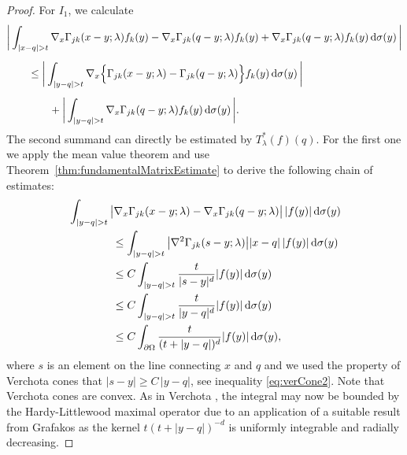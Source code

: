 \begin{proof}
   For $I_1$, we calculate
   \begin{align*}
     &\bigg| \int_{| x - q | > t} \nabla_x \Gamma_{j k} (x - y; \lambda) f_k(y) - \nabla_x \Gamma_{jk}(q - y; \lambda) f_k(y) + \nabla_x \Gamma_{jk}(q - y; \lambda) f_k(y) \, {\operatorname{d}\!{\sigma}}(y) \, \bigg| \\[0.5em]
     &\qquad\leq \bigg| \int_{|y - q| > t} \nabla_x \Big\{ \Gamma_{jk}(x - y; \lambda) -  \Gamma_{jk}(q - y; \lambda)\Big\} f_k(y) \, {\operatorname{d}\!{\sigma}}(y) \, \bigg| \\[0.5em]
     &\qquad\qquad+ \bigg| \int_{|y - q| > t} \nabla_x\Gamma_{jk}(q - y; \lambda) f_k(y) \, {\operatorname{d}\!{\sigma}}(y) \, \bigg|.
   \end{align*}
  The second summand can directly be estimated by $T_\lambda^*(f)(q)$.
  For the first one we apply the mean value theorem and use Theorem~\ref{thm:fundamentalMatrixEstimate} to derive the following chain of estimates:
  \begin{align*}
    &\int_{|y - q| > t} \big| \nabla_x\Gamma_{jk}(x - y; \lambda) - \nabla_x\Gamma_{jk}(q - y; \lambda) \big| \, |f(y)| \, {\operatorname{d}\!{\sigma}}(y) \\ 
    &\qquad\qquad\leq \int_{|y - q| > t} \big|\nabla^2 \Gamma_{jk}(s - y; \lambda)\big| |x - q|\, |f(y) | \, {\operatorname{d}\!{\sigma}}(y) \\
    &\qquad\qquad\leq C \int_{|y - q| > t} \frac{t}{|s - y|^{d}} |f(y)| \, {\operatorname{d}\!{\sigma}}(y) \\
    &\qquad\qquad\leq C \int_{|y - q| > t} \frac{t}{|y - q|^{d}} |f(y)| \, {\operatorname{d}\!{\sigma}}(y) \\
    &\qquad\qquad\leq C \int_{\partial\Omega} \frac{t}{(t + |y - q|)^d} |f(y)| \, {\operatorname{d}\!{\sigma}}(y),
  \end{align*}
  where $s$ is an element on the line connecting $x$ and $q$ and we used the property of Verchota cones that $|s - y| \geq C\, |y - q|$, see inequality \eqref{eq:verCone2}.
  Note that Verchota cones are convex.
  As in Verchota \cite[Lem.\@~1.3]{verchota}, the integral may now be bounded by the Hardy-Littlewood maximal operator due to an application of a suitable result from Grafakos \cite[Thm.\@~2.1.10]{grafakos2014classical} as the kernel ${t}(t + |y - q|)^{-d}$ is uniformly integrable and radially decreasing.%

\end{proof}

